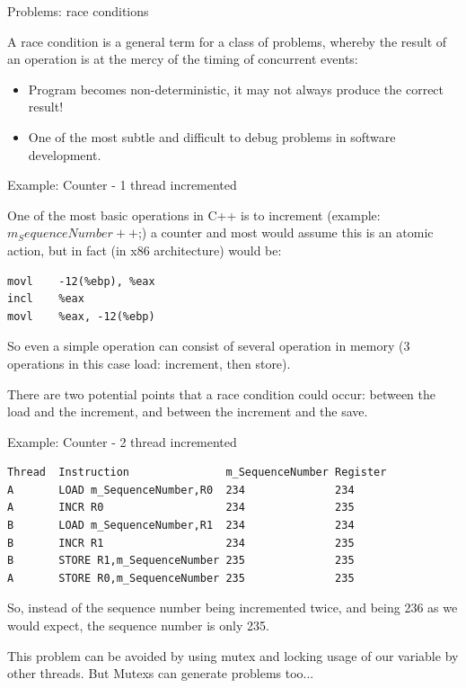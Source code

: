 \documentclass[8pt]{beamer}
\begin{document}
\begin{frame}[fragile]{Problems: race conditions}
\footnotesize

A race condition is a general term for a class of problems, whereby the result of an operation is at the mercy of the timing of concurrent events:
\begin{itemize}
  \item Program becomes non-deterministic, it may not always produce the correct result!
  \item One of the most subtle and difficult to debug problems in software development.
\end{itemize}

\begin{exampleblock}{Example: Counter - 1 thread incremented}
\footnotesize

One of the most basic operations in C++ is to increment (example: $m_SequenceNumber++$;) a counter and most would assume this is an atomic action, but in fact (in x86 architecture) would be:

\begin{lstlisting} 
movl    -12(%ebp), %eax
incl    %eax
movl    %eax, -12(%ebp)
\end{lstlisting}

So even a simple operation can consist of several operation in memory (3 operations in this case load: increment, then store).

\end{exampleblock}
\footnotesize

There are two potential points that a race condition could occur: between the load and the increment, and between the increment and the save.

\begin{exampleblock}{Example: Counter - 2 thread incremented}

\begin{lstlisting} 
Thread  Instruction               m_SequenceNumber Register
A       LOAD m_SequenceNumber,R0  234              234
A       INCR R0                   234              235
B       LOAD m_SequenceNumber,R1  234              234
B       INCR R1                   234              235
B       STORE R1,m_SequenceNumber 235              235
A       STORE R0,m_SequenceNumber 235              235
\end{lstlisting}

So, instead of the sequence number being incremented twice, and being 236 as we would expect, the sequence number is only 235.

\end{exampleblock}

This problem can be avoided by using mutex and locking usage of our variable by other threads. But Mutexs can generate problems too... 

\end{frame}
\end{document}
